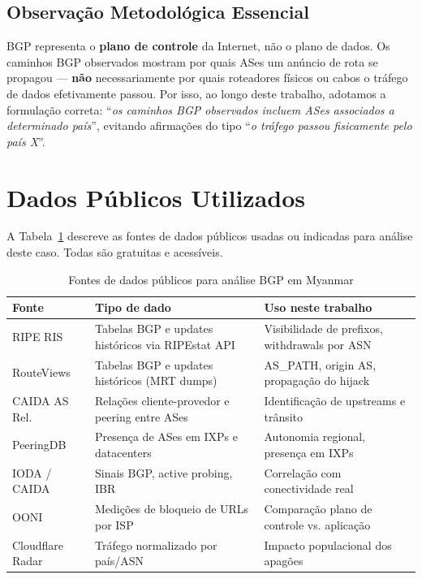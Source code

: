 \documentclass[12pt]{article}
\begin{document}
\subsection{Observação Metodológica Essencial}

BGP representa o \textbf{plano de controle} da Internet, não o plano de dados.
Os caminhos BGP observados mostram por quais ASes um anúncio de rota se
propagou --- \textbf{não} necessariamente por quais roteadores físicos ou
cabos o tráfego de dados efetivamente passou. Por isso, ao longo deste
trabalho, adotamos a formulação correta: ``\textit{os caminhos BGP observados
incluem ASes associados a determinado país}'', evitando afirmações do tipo
``\textit{o tráfego passou fisicamente pelo país X}''.


\section{Dados Públicos Utilizados}

A Tabela~\ref{tab:fontes} descreve as fontes de dados públicos usadas ou
indicadas para análise deste caso. Todas são gratuitas e acessíveis.

\begin{table}[ht]
\centering
\caption{Fontes de dados públicos para análise BGP em Myanmar}
\label{tab:fontes}
\begin{tabular}{@{}p{3.2cm}p{5.0cm}p{4.5cm}@{}}
\toprule
\textbf{Fonte} & \textbf{Tipo de dado} & \textbf{Uso neste trabalho} \\
\midrule
RIPE RIS        & Tabelas BGP e updates históricos via RIPEstat API  & Visibilidade de prefixos, withdrawals por ASN \\
RouteViews      & Tabelas BGP e updates históricos (MRT dumps)       & AS\_PATH, origin AS, propagação do hijack \\
CAIDA AS Rel.   & Relações cliente-provedor e peering entre ASes     & Identificação de upstreams e trânsito \\
PeeringDB       & Presença de ASes em IXPs e datacenters            & Autonomia regional, presença em IXPs \\
IODA / CAIDA    & Sinais BGP, active probing, IBR                   & Correlação com conectividade real \\
OONI            & Medições de bloqueio de URLs por ISP               & Comparação plano de controle vs. aplicação \\
Cloudflare Radar & Tráfego normalizado por país/ASN                 & Impacto populacional dos apagões \\
\bottomrule
\end{tabular}
\end{table}
\end{document}
